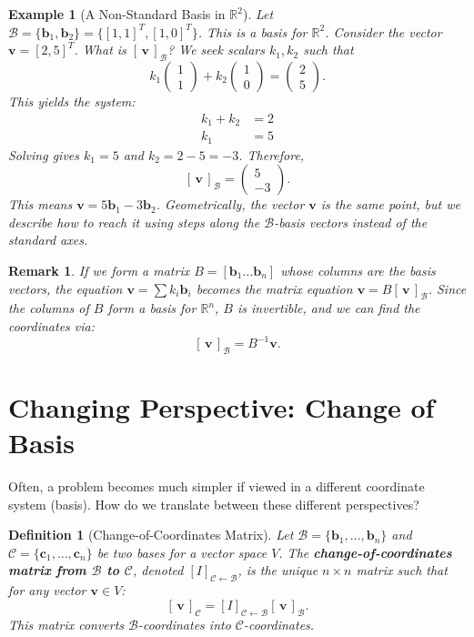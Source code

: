 \documentclass[11pt, a4paper]{article}
\theoremstyle{mytheoremstyle}
\theoremstyle{mydefstyle}
\newtheorem{definition}[theorem]{Definition}
\newtheorem{example}[theorem]{Example}
\newtheorem{remark}[theorem]{Remark}
\newcommand{\R}{\mathbb{R}}      %
\newcommand{\B}{\mathcal{B}}    %
\newcommand{\C}{\mathcal{C}}    %
\newcommand{\vb}{\mathbf{v}}     %
\newcommand{\bb}{\mathbf{b}}     %
\newcommand{\cb}{\mathbf{c}}     %
\newcommand{\coord}[2]{[\,#1\,]_{\mathcal{#2}}} %
\newcommand{\changebasis}[2]{[I]_{\mathcal{#1} \leftarrow \mathcal{#2}}} %
\begin{document}
\begin{example}[A Non-Standard Basis in $\R^2$]
Let $\B = \{\bb_1, \bb_2\} = \{[1, 1]^T, [1, 0]^T\}$. This is a basis for $\R^2$. Consider the vector $\vb = [2, 5]^T$. What is $\coord{\vb}{B}$? We seek scalars $k_1, k_2$ such that
\[ k_1 \begin{pmatrix} 1 \\ 1 \end{pmatrix} + k_2 \begin{pmatrix} 1 \\ 0 \end{pmatrix} = \begin{pmatrix} 2 \\ 5 \end{pmatrix}. \]
This yields the system:
\begin{align*} k_1 + k_2 &= 2 \\ k_1 \qquad &= 5 \end{align*}
Solving gives $k_1 = 5$ and $k_2 = 2 - 5 = -3$. Therefore,
\[ \coord{\vb}{B} = \begin{pmatrix} 5 \\ -3 \end{pmatrix}. \]
This means $\vb = 5\bb_1 - 3\bb_2$. Geometrically, the vector $\vb$ is the same point, but we describe how to reach it using steps along the $\B$-basis vectors instead of the standard axes.
\end{example}

\begin{remark}
If we form a matrix $B = [\bb_1 \dots \bb_n]$ whose columns are the basis vectors, the equation $\vb = \sum k_i \bb_i$ becomes the matrix equation $\vb = B \coord{\vb}{B}$. Since the columns of $B$ form a basis for $\R^n$, $B$ is invertible, and we can find the coordinates via:
\[ \coord{\vb}{B} = B^{-1} \vb. \]
\end{remark}

\section{Changing Perspective: Change of Basis}

Often, a problem becomes much simpler if viewed in a different coordinate system (basis). How do we translate between these different perspectives?

\begin{definition}[Change-of-Coordinates Matrix]
Let $\B = \{\bb_1, \dots, \bb_n\}$ and $\C = \{\cb_1, \dots, \cb_n\}$ be two bases for a vector space $V$. The \textbf{change-of-coordinates matrix from $\B$ to $\C$}, denoted $\changebasis{C}{B}$, is the unique $n \times n$ matrix such that for any vector $\vb \in V$:
\[ \coord{\vb}{C} = \changebasis{C}{B} \coord{\vb}{B}. \]
This matrix converts $\B$-coordinates into $\C$-coordinates.
\end{definition}
\end{document}
